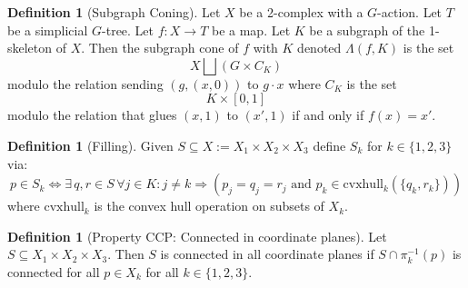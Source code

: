 \documentclass[12pt,parskip=full]{report}
\theoremstyle{plain}
\theoremstyle{definition}
\newtheorem{dfn}[thm]{Definition}
\begin{document}
\begin{dfn}
    [Subgraph Coning]
    \label{dfn:subgraphconing}
    Let \(X\) be a 2-complex with a \(G\)-action. Let \(T\) be a simplicial \(G\)-tree. Let \(f:X\to T\) be a map. Let \(K\) be a subgraph of the 1-skeleton of \(X\). Then the subgraph cone of \(f\) with \(K\) denoted \(\Lambda(f, K)\) is the set \[X \bigsqcup \left(G\times C_K\right)\] modulo the relation sending \((g, (x,0))\) to \(g\cdot x\) where \(C_K\) is the set \[ K\times [0,1]\] modulo the relation that glues \((x,1)\) to \((x', 1)\) if and only if \(f(x) = x'\). 
\end{dfn}

\begin{dfn}
	[Filling]
	\label{defn:filling}
    Given \(S \subseteq X := X_1\times X_2\times X_3\) define \(S_{k}\) for \(k \in \{1,2,3\}\) via: 
    \[
        p \in S_{k} \iff \exists 
        \,q,r\in S\, \forall j\in K: j\neq k 
        \Longrightarrow ( p_{j} = q_{j} = r_{j}
        \text{ and } p_{k} \in \text{cvxhull}_k (\{q_{k} , r_{k}\}))
    \] 
    where \(\text{cvxhull}_k\) is the convex hull operation on subsets of \(X_k\).
\end{dfn}

\begin{dfn}
    [Property CCP: Connected in coordinate planes]
    \label{defn:ccp} 
    Let \(S \subseteq X_1\times X_2\times X_3\). Then \(S\) is connected in all coordinate planes if \(S \cap \pi_{k}^{-1} (p)\) is connected for all \(p \in X_{k}\) for all \(k\in \{1,2,3\}\).
\end{dfn}
\end{document}
